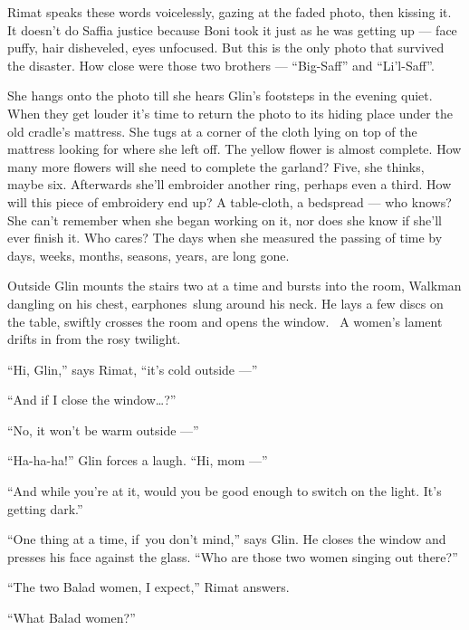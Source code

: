 \documentclass[twoside,11pt]{book}
\begin{document}
Rimat speaks these words voicelessly, gazing at the faded photo, then kissing it.
It doesn't do Saffia
justice because Boni took it just as he was getting up --- face
puffy, hair disheveled,
eyes unfocused. But this is the only photo that survived the
disaster. How close were those two brothers --- ``Big-Saff{}''
and ``Li'l-Saff''.

S{he hangs onto the photo till she hears Glin's footsteps in the
evening quiet. When }they get louder {it's time to return the photo
to its hiding place under the old cradle's mattress. She tugs at a corner of
the}{ }cloth lying on top of the
mattress{ looking for where she left off. The yellow flower is almost
complete. How many more flowers will she need} {to complete the
garland? Five, she }thinks{, maybe six. Afterwards she'll embroider
another }ring, p{erhaps even a third.
}How{ will this piece of embroidery
end }up?{ }A{
table{}-cloth,} a {bedspread --- who knows? She can't remember when
she began working on }it, nor does she know if she'll {ever finish
it. Who cares? }The days when she measured the passing of time by days, weeks, months, seasons, years,  are long
gone.

{Outside Glin }mounts the
stairs {two at a time and bursts into the room, Walkman dangling on
his chest, earphones~}slung{ around his neck. He lays a few discs on
the table, swiftly crosses the room and opens the window.~ A women's lament drifts in from the rosy twilight.}

{ {}``}Hi,{
Glin,'' says Rimat, ``it's cold outside ---''}

``And if I{ close the window{\ldots}?''}

{}``No, it won't be warm outside ---''

{{}``Ha-ha-ha!'' Glin }forces a
laugh. ``Hi, mom ---'' 

{{}``And while you're at it, }would you be good enough to switch on
the light. {It's getting dark.{}''}

``One thing at a time, if~you don't
mind{,'' says Glin. He closes the window and presses his face against
the glass}.{ ``Who are those
}two{ }{women singing out
there?''}

{{}``The two Balad women, I
}expect{,'' Rimat answers.}

{}``What Balad women?''
\end{document}

